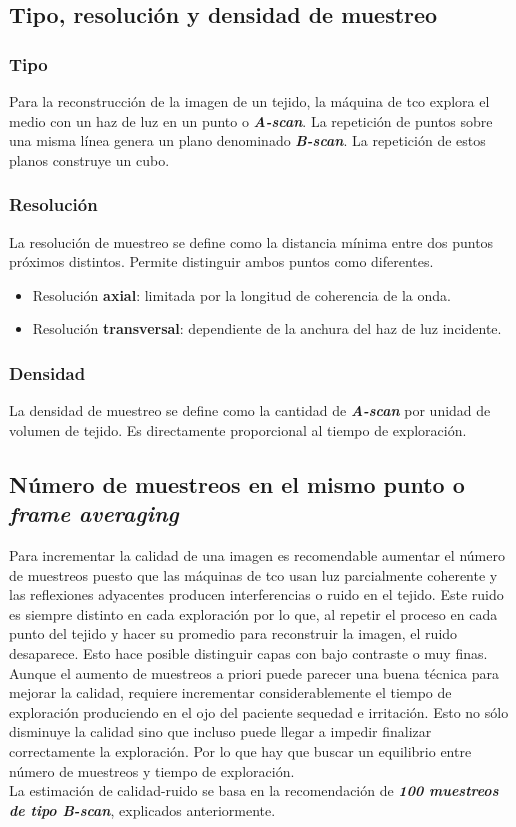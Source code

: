\subsection{Tipo, resolución y densidad de muestreo}
\subsubsection{Tipo}
Para la reconstrucción de la imagen de un tejido, la máquina de
\gls{tco} explora el medio con un haz de luz en un punto o
\emph{\textbf{A-scan}}. La repetición de puntos sobre una misma línea
genera un plano denominado \emph{\textbf{B-scan}}. La repetición de
estos planos construye un cubo.
\subsubsection{Resolución}
La resolución de muestreo se define como la distancia mínima entre dos
puntos próximos distintos. Permite distinguir ambos puntos como
diferentes.
\begin{itemize}
\item Resolución \textbf{axial}: limitada por la longitud de
  coherencia de la onda.
\item Resolución \textbf{transversal}: dependiente de la anchura del
  haz de luz incidente.
\end{itemize}
\subsubsection{Densidad}
La densidad de muestreo se define como la cantidad de
\emph{\textbf{A-scan}} por unidad de volumen de tejido. Es
directamente proporcional al tiempo de exploración.

\subsection{Número de muestreos en el mismo punto o \emph{frame
    averaging}}
Para incrementar la calidad de una imagen es recomendable aumentar el
número de muestreos puesto que las máquinas de \gls{tco} usan luz
parcialmente coherente y las reflexiones adyacentes producen
interferencias o ruido en el tejido. Este ruido es siempre distinto en
cada exploración por lo que, al repetir el proceso en cada punto del
tejido y hacer su promedio para reconstruir la imagen, el ruido
desaparece. Esto hace posible distinguir capas con bajo contraste o
muy finas.\\
Aunque el aumento de muestreos a priori puede parecer una buena
técnica para mejorar la calidad, requiere incrementar
considerablemente el tiempo de exploración produciendo en el ojo del
paciente sequedad e irritación. Esto no sólo disminuye la calidad sino
que incluso puede llegar a impedir finalizar correctamente la
exploración. Por lo que hay que buscar un equilibrio entre número de
muestreos y tiempo de exploración.\\
La estimación de calidad-ruido se basa en la recomendación de
\emph{\textbf{100 muestreos de tipo B-scan}}, explicados
anteriormente.

